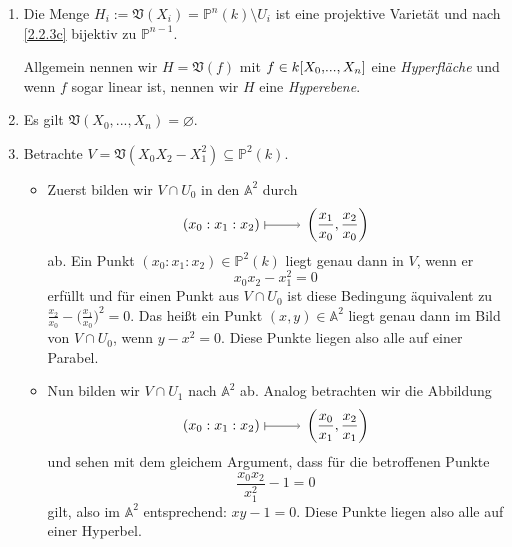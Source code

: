 \documentclass[a4paper,12pt]{scrbook}
\theoremstyle{keinenummern} %
\theoremstyle{mitnummern}
\theoremstyle{unserbeweis}
\def\A{\mathbb{A}}
\def\V{\mathfrak{V}}
\def\P{\mathbb{P}}
\newcommand{\leer}{\ensuremath{\varnothing}}
\renewcommand{\dotsc}{\ensuremath{\!...}}
\renewcommand{\mapsto}{\raisebox{-1pt}{\tikz{\draw[thin,shorten >=3pt, |->] (0,0) node{\hspace*{0pt}} -- node{} (1,0);}}\penalty1000\relax}
\newcommand{\ppolyx}[1][n]{\ensuremath%
  [X_{0},\dotsc,X_{#1}]}
\begin{document}
\begin{bsp}\label{2.3.3}\begin{enumerate}
\item Die Menge $H_{i}:=\V(X_{i})=\P^{n}(k)\setminus U_{i}$ ist eine projektive Varietät und nach \cref{2.2.3c} bijektiv zu $\P^{n-1}$.

Allgemein nennen wir $H=\V(f)$ mit $f\in k\ppolyx$ eine \emph{Hyperfläche} und wenn $f$ sogar linear ist, nennen wir $H$ eine \emph{Hyperebene}.
\item Es gilt $\V(X_{0},\dotsc,X_{n})=\leer$.
\item Betrachte $V=\V(X_{0}X_{2}-X_{1}^{2})\subseteq\P^{2}(k)$.
\begin{itemize}
\item Zuerst bilden wir $V\cap U_{0}$ in den $\A^{2}$ durch
\[(x_{0}:x_{1}:x_{2})\mapsto\left(\frac{x_{1}}{x_{0}},\frac{x_{2}}{x_{0}}\right)\]
ab. Ein Punkt $(x_{0}:x_{1}:x_{2})\in\P^{2}(k)$ liegt genau dann in $V$, wenn er \[x_{0}x_{2}-x_{1}^{2}=0\] erfüllt und für einen Punkt aus $V\cap U_{0}$ ist diese Bedingung äquivalent zu $\frac{x_{2}}{x_{0}}-\bigl(\frac{x_{1}}{x_{0}}\bigr)^{2}=0$. Das heißt ein Punkt $(x,y)\in\A^{2}$ liegt genau dann im Bild von $V\cap U_{0}$, wenn $y-x^{2}=0$. Diese Punkte liegen also alle auf einer Parabel.
\item Nun bilden wir $V\cap U_{1}$ nach $\A^{2}$ ab. Analog betrachten wir die Abbildung
\[(x_{0}:x_{1}:x_{2})\mapsto\left(\frac{x_{0}}{x_{1}},\frac{x_{2}}{x_{1}}\right)\]
und sehen mit dem gleichem Argument, dass für die betroffenen Punkte \[\frac{x_{0}x_{2}}{x_{1}^{2}}-1=0\] gilt, also im $\A^{2}$ entsprechend: $xy-1=0$. Diese Punkte liegen also alle auf einer Hyperbel.
\end{itemize}\end{enumerate}\end{bsp}
\end{document}
